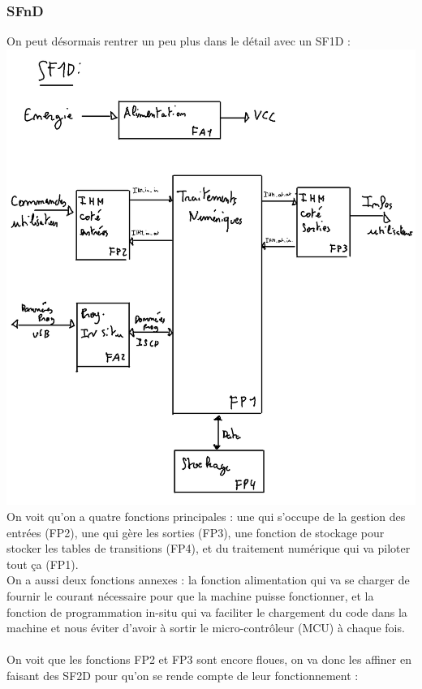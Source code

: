 \documentclass[12pt]{article}
\begin{document}
	\subsubsection{SFnD}
	On peut désormais rentrer un peu plus dans le détail avec un SF1D :\\
	\includegraphics[width=\textwidth]{img/SF1D}
	On voit qu'on a quatre fonctions principales : une qui s'occupe de la gestion des entrées (FP2), une qui gère les sorties (FP3), une fonction de stockage pour stocker les tables de transitions (FP4), et du traitement numérique qui va piloter tout ça (FP1).\\
	On a aussi deux fonctions annexes : la fonction alimentation qui va se charger de fournir le courant nécessaire pour que la machine puisse fonctionner, et la fonction de programmation in-situ qui va faciliter le chargement du code dans la machine et nous éviter d'avoir à sortir le micro-contrôleur (MCU) à chaque fois.\\
	\\
	On voit que les fonctions FP2 et FP3 sont encore floues, on va donc les affiner en faisant des SF2D pour qu'on se rende compte de leur fonctionnement :\\
\end{document}
